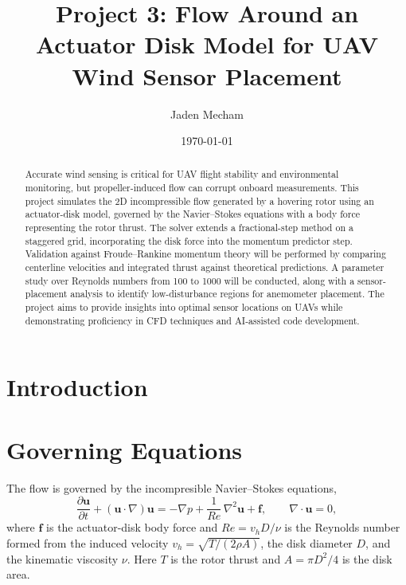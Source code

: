 \documentclass[
  aapm,
  amsmath,amssymb,
  reprint,          %
  floatfix
]{revtex4-2}
\begin{document}
\title{Project 3: Flow Around an Actuator Disk Model for UAV Wind Sensor Placement}

\author{Jaden Mecham}

\date{\today}

\begin{abstract}
Accurate wind sensing is critical for UAV flight stability and environmental monitoring, 
but propeller-induced flow can corrupt onboard measurements. This project simulates 
the 2D incompressible flow generated by a hovering rotor using an actuator-disk model, 
governed by the Navier--Stokes equations with a body force representing the rotor thrust. 
The solver extends a fractional-step method on a staggered grid, incorporating the 
disk force into the momentum predictor step. Validation against Froude--Rankine 
momentum theory will be performed by comparing centerline velocities and integrated 
thrust against theoretical predictions. A parameter study over Reynolds numbers 
from 100 to 1000 will be conducted, along with a sensor-placement analysis to identify 
low-disturbance regions for anemometer placement. The project aims to provide insights 
into optimal sensor locations on UAVs while demonstrating proficiency in CFD techniques 
and AI-assisted code development.
\end{abstract}

\maketitle

\section{Introduction}

\section{Governing Equations}
The flow is governed by the incompresible Navier--Stokes equations,
\begin{equation}
  \frac{\partial \mathbf{u}}{\partial t}
  + (\mathbf{u}\cdot\nabla)\mathbf{u}
  = -\nabla p + \frac{1}{Re}\,\nabla^{2}\mathbf{u} + \mathbf{f},
  \qquad \nabla\cdot\mathbf{u} = 0,
\end{equation}
where $\mathbf{f}$ is the actuator-disk body force and
$Re = v_{h} D / \nu$ is the Reynolds number formed from the induced velocity
$v_{h} = \sqrt{T/(2\rho A)}$, the disk diameter $D$, and the kinematic viscosity $\nu$.
Here $T$ is the rotor thrust and $A = \pi D^{2}/4$ is the disk area.
\end{document}
